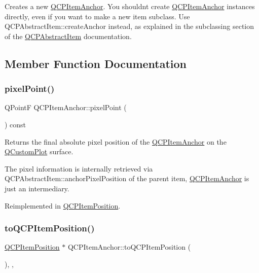 Creates a new \hyperlink{class_q_c_p_item_anchor}{Q\+C\+P\+Item\+Anchor}. You shouldn\textquotesingle{}t create \hyperlink{class_q_c_p_item_anchor}{Q\+C\+P\+Item\+Anchor} instances directly, even if you want to make a new item subclass. Use Q\+C\+P\+Abstract\+Item\+::create\+Anchor instead, as explained in the subclassing section of the \hyperlink{class_q_c_p_abstract_item}{Q\+C\+P\+Abstract\+Item} documentation. 

\subsection{Member Function Documentation}
\hypertarget{class_q_c_p_item_anchor_ae1a21d9471d1d788624cad297e1b8d6f}{}\label{class_q_c_p_item_anchor_ae1a21d9471d1d788624cad297e1b8d6f} 
\subsubsection{\texorpdfstring{pixel\+Point()}{pixelPoint()}}
{\footnotesize\ttfamily Q\+PointF Q\+C\+P\+Item\+Anchor\+::pixel\+Point (\begin{DoxyParamCaption}{ }\end{DoxyParamCaption}) const\hspace{0.3cm}{\ttfamily [virtual]}}

Returns the final absolute pixel position of the \hyperlink{class_q_c_p_item_anchor}{Q\+C\+P\+Item\+Anchor} on the \hyperlink{class_q_custom_plot}{Q\+Custom\+Plot} surface.

The pixel information is internally retrieved via Q\+C\+P\+Abstract\+Item\+::anchor\+Pixel\+Position of the parent item, \hyperlink{class_q_c_p_item_anchor}{Q\+C\+P\+Item\+Anchor} is just an intermediary. 

Reimplemented in \hyperlink{class_q_c_p_item_position_a6cad070c22801295231f5bd6045afe70}{Q\+C\+P\+Item\+Position}.

\hypertarget{class_q_c_p_item_anchor_ac54b20120669950255a63587193dbb86}{}\label{class_q_c_p_item_anchor_ac54b20120669950255a63587193dbb86} 
\subsubsection{\texorpdfstring{to\+Q\+C\+P\+Item\+Position()}{toQCPItemPosition()}}
{\footnotesize\ttfamily \hyperlink{class_q_c_p_item_position}{Q\+C\+P\+Item\+Position} $\ast$ Q\+C\+P\+Item\+Anchor\+::to\+Q\+C\+P\+Item\+Position (\begin{DoxyParamCaption}{ }\end{DoxyParamCaption})\hspace{0.3cm}{\ttfamily [inline]}, {\ttfamily [protected]}, {\ttfamily [virtual]}}

